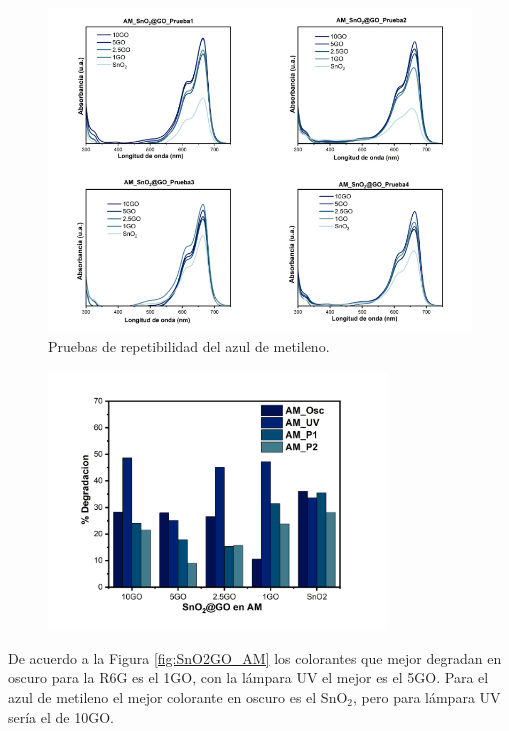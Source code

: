 \documentclass[12pt]{article}
\begin{document}
  \begin{figure}[htbp]
    \centering
    \includegraphics[width=0.8\linewidth]{Imagenes/RepeticionesAzul.png}
    \caption{Pruebas de repetibilidad del azul de metileno.}
    \label{fig:PruebasAM_SNO2GO}
    \end{figure}     
\begin{figure}[H]
    	   \begin{center}
     	  	\includegraphics[width = 0.8\textwidth]{Imagenes/AM_PruebasSnO2.png}
    	   \end{center} 
        \end{figure}
De acuerdo a la Figura \ref{fig:SnO2GO_AM} los colorantes que mejor degradan en oscuro para la R6G es el 1GO, con la lámpara UV el mejor es el 5GO. Para el azul de metileno el mejor colorante en oscuro es el SnO$\displaystyle _{2}$, pero para lámpara UV sería el de 10GO. 
\end{document}
